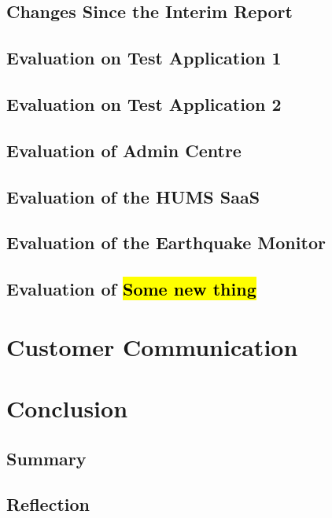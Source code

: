 \documentclass[10pt,a4paper]{article}
\begin{document}
\subsection{Changes Since the Interim Report}
\label{sec:changes}


\subsection{Evaluation on Test Application 1}
\label{sec:test_app1}


\subsection{Evaluation on Test Application 2}
\label{sec:test_app2}


\subsection{Evaluation of Admin Centre}
\label{sec:admin_centre}


\subsection{Evaluation of the HUMS SaaS}
\label{sec:hums_saas}


\subsection{Evaluation of the Earthquake Monitor}
\label{sec:earthquake}


\subsection{Evaluation of \hl{Some new thing}}
\label{sec:new_thing} %


\section{Customer Communication}
\label{sec:customer_comms}

\section{Conclusion}
\label{sec:conclusion}


\subsection{Summary}
\label{sec:summary}


\subsection{Reflection}
\label{sec:reflection}



\end{document}
